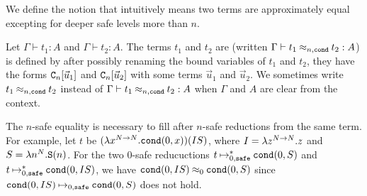 We define the notion  that intuitively means
two terms are approximately equal excepting for deeper safe levels more than $n$. 

\begin{definition}
  Let $\Gamma\vdash t_1:A$ and $\Gamma\vdash t_2:A$. 
  The terms $t_1$ and $t_2$ are  (written $\Gamma \vdash t_1 \mathbin{\approx_{n,{\tt cond}}} t_2 : A$)
  is defined by after possibly renaming the bound variables of $t_1$ and $t_2$, 
  they have the forms ${\tt C}_{n}[\vec{u}_1]$ and ${\tt C}_{n}[\vec{u}_2]$
  with some terms $\vec{u}_1$ and $\vec{u}_2$.
  We sometimes write $t_1 \mathbin{\approx_{n,{\tt cond}}} t_2$ instead of $\Gamma \vdash t_1\mathbin{\approx_{n,{\tt cond}}} t_2:A$
  when $\Gamma$ and $A$ are clear from the context. 
\end{definition}

The $n$-safe equality is necessary to fill 
after $n$-safe reductions from the same term.
For example, let $t$ be $(\lambda x^{{N}\to{N}}.{\tt cond}(0,x))(IS)$,
where $I = \lambda z^{{N}\to{N}}.z$ and $S = \lambda n^{N}.{\tt S}(n)$.
For the two $0$-safe reducuctions 
$t \mathbin{\mathbin{\mapsto}_{0,{\hbox{\scriptsize \tt safe}}}^*} {\tt cond}(0,S)$ and $t \mathbin{\mathbin{\mapsto}_{0,{\hbox{\scriptsize \tt safe}}}^*} {\tt cond}(0,IS)$, 
we have ${\tt cond}(0,IS) \mathbin{\approx_{0}} {\tt cond}(0,S)$
since ${\tt cond}(0,IS) \mathbin{\mathbin{\mapsto}_{0,{\hbox{\scriptsize \tt safe}}}} {\tt cond}(0,S)$ does not hold. 


